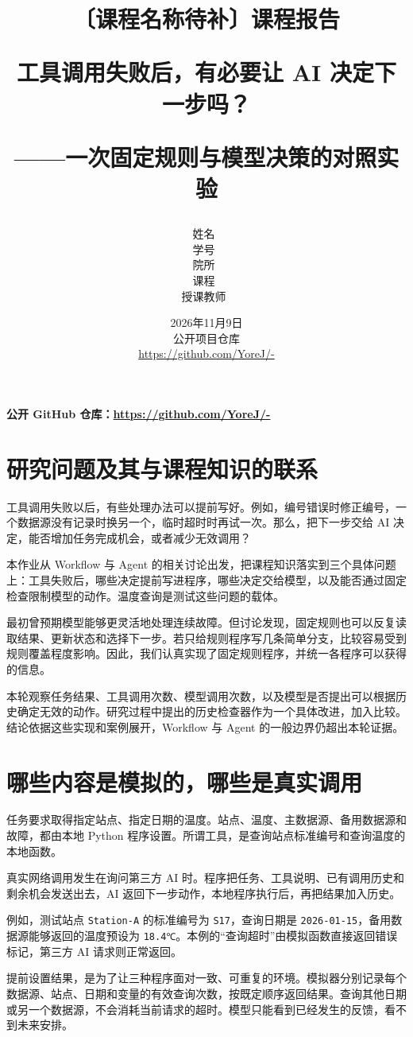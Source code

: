 \documentclass[12pt,a4paper,UTF8,fontset=none]{ctexart}
\title{\vspace{0.8cm}\heiti\LARGE\textbf{〔课程名称待补〕课程报告}\par
\vspace{0.8cm}\songti\Large 工具调用失败后，有必要让 AI 决定下一步吗？\par
\vspace{0.3cm}\large ——一次固定规则与模型决策的对照实验\vspace{1.4cm}}
\author{\songti\large 姓名\ \dlmu[8cm]{〔待补〕}\\[0.35cm]
学号\ \dlmu[8cm]{〔待补〕}\\[0.35cm]
院所\ \dlmu[8cm]{〔待补〕}\\[0.35cm]
课程\ \dlmu[8cm]{〔待补〕}\\[0.35cm]
授课教师\ \dlmu[7.1cm]{〔待补〕}}
\date{2026年11月9日\\[0.6cm]\small 公开项目仓库\\\url{https://github.com/YoreJ/-}}
\begin{document}
\cover
\thispagestyle{empty}
\clearpage
{}
\tableofcontents
\clearpage
\nocite{shield,sentry,cache}

\textbf{公开 GitHub 仓库：\url{https://github.com/YoreJ/-}}


\section{研究问题及其与课程知识的联系}

工具调用失败以后，有些处理办法可以提前写好。例如，编号错误时修正编号，一个数据源没有记录时换另一个，临时超时时再试一次。那么，把下一步交给 AI 决定，能否增加任务完成机会，或者减少无效调用？


本作业从 Workflow 与 Agent 的相关讨论出发，把课程知识落实到三个具体问题上：工具失败后，哪些决定提前写进程序，哪些决定交给模型，以及能否通过固定检查限制模型的动作。温度查询是测试这些问题的载体。


最初曾预期模型能够更灵活地处理连续故障。但讨论发现，固定规则也可以反复读取结果、更新状态和选择下一步。若只给规则程序写几条简单分支，比较容易受到规则覆盖程度影响。因此，我们认真实现了固定规则程序，并统一各程序可以获得的信息。


本轮观察任务结果、工具调用次数、模型调用次数，以及模型是否提出可以根据历史确定无效的动作。研究过程中提出的历史检查器作为一个具体改进，加入比较。结论依据这些实现和案例展开，Workflow 与 Agent 的一般边界仍超出本轮证据。


\section{哪些内容是模拟的，哪些是真实调用}

任务要求取得指定站点、指定日期的温度。站点、温度、主数据源、备用数据源和故障，都由本地 Python 程序设置。所谓工具，是查询站点标准编号和查询温度的本地函数。


真实网络调用发生在询问第三方 AI 时。程序把任务、工具说明、已有调用历史和剩余机会发送出去，AI 返回下一步动作，本地程序执行后，再把结果加入历史。


例如，测试站点 \texttt{Station-\allowbreak{}A} 的标准编号为 \texttt{S17}，查询日期是 \texttt{2026-\allowbreak{}01-\allowbreak{}15}，备用数据源能够返回的温度预设为 \texttt{18.4℃}。本例的“查询超时”由模拟函数直接返回错误标记，第三方 AI 请求则正常返回。


提前设置结果，是为了让三种程序面对一致、可重复的环境。模拟器分别记录每个数据源、站点、日期和变量的有效查询次数，按既定顺序返回结果。查询其他日期或另一个数据源，不会消耗当前请求的超时。模型只能看到已经发生的反馈，看不到未来安排。
\end{document}
